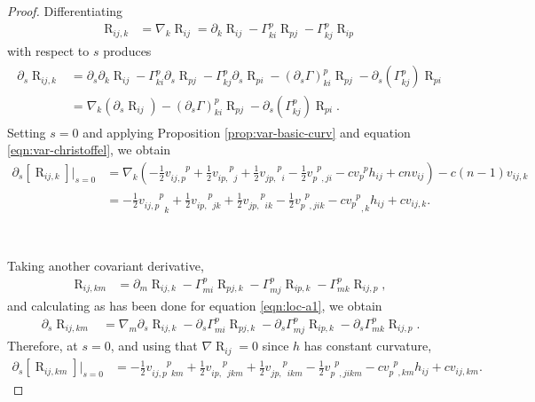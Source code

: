 \documentclass[10pt,reqno]{amsart}
\DeclareMathOperator{\Rc}{R}
\newcommand{\vdu}[2]{v_{#1}^{\phantom{#1} #2}}
\newcommand{\vdddu}[4]{v_{#1 #2, #3}^{\phantom{#1#2,#3} #4}}
\newcommand{\vddud}[4]{v_{#1 #2, \phantom{#3} #4}^{\phantom{#1#2,} #3 \phantom{#4}}}
\newcommand{\vdudd}[4]{v_{#1 \phantom{#2}, #3 #4}^{\phantom{#1} #2 \phantom{, #3 #4}}}
\newcommand{\vdddudd}[6]{v_{#1#2,#3\phantom{#4}#5#6}^{\phantom{#1#2,#3}#4\phantom{#5#6}}}
\newcommand{\vdduddd}[6]{v_{#1#2,\phantom{#3}#4#5#6}^{\phantom{#1#2,}#3\phantom{#4#5#6}}}
\newcommand{\vdudddd}[6]{v_{#1\phantom{#2},#3#4#5#6}^{\phantom{#1}#2\phantom{,#3#4#5#6}}}
\begin{document}
\begin{proof}
Differentiating 
\begin{align*}
\Rc_{ij,k} &= \nabla_k \Rc_{ij} = \partial_k \Rc_{ij} - \Gamma_{ki}^p \Rc_{pj} - \Gamma_{kj}^p \Rc_{ip}
\end{align*}
with respect to $s$ produces
\begin{align} \label{eqn:loc-a1}
\begin{aligned}
\partial_s \Rc_{ij,k} 
&= \partial_s \partial_k \Rc_{ij} - \Gamma_{ki}^p \partial_s \Rc_{pj} - \Gamma_{kj}^p \partial_s \Rc_{pi} - (\partial_s\Gamma)_{ki}^p \Rc_{pj} - \partial_s(\Gamma_{kj}^p) \Rc_{pi} \\
	&= \nabla_k (\partial_s \Rc_{ij}) - (\partial_s\Gamma)_{ki}^p \Rc_{pj} - \partial_s(\Gamma_{kj}^p) \Rc_{pi}.
\end{aligned}
\end{align}
Setting $s=0$ and applying Proposition \ref{prop:var-basic-curv} and equation \eqref{eqn:var-christoffel}, we obtain
\begin{align*}
\partial_s [\Rc_{ij,k}] |_{s=0}
&= \nabla_k \left( -\frac{1}{2} \vdddu{i}{j}{p}{p}  + \frac{1}{2} \vddud{i}{p}{p}{j} + \frac{1}{2} \vddud{j}{p}{p}{i} - \frac{1}{2} \vdudd{p}{p}{j}{i} - c \vdu{p}{p} h_{ij} + c n v_{ij} \right) - c(n-1) v_{ij,k} \nonumber \\
&= -\frac{1}{2} {\vdddu{i}{j}{p}{p}}_k  + \frac{1}{2} \vddud{i}{p}{p}{jk} + \frac{1}{2} \vddud{j}{p}{p}{ik} - \frac{1}{2} \vdudd{p}{p}{j}{ik} - c {\vdu{p}{p}}_{,k} h_{ij} + c v_{ij,k}.
\end{align*}

\

Taking another covariant derivative, 
\begin{align*}
\Rc_{ij,km} &= \partial_m \Rc_{ij,k} - \Gamma_{mi}^p \Rc_{pj,k} - \Gamma_{mj}^p \Rc_{ip,k} - \Gamma_{mk}^p \Rc_{ij,p},
\end{align*}
and calculating as has been done for equation \eqref{eqn:loc-a1}, we obtain
\begin{align*}
\partial_s \Rc_{ij,km} &= \nabla_m \partial_s \Rc_{ij,k} - \partial_s \Gamma_{mi}^p \Rc_{pj,k} - \partial_s \Gamma_{mj}^p \Rc_{ip,k} - \partial_s \Gamma_{mk}^p \Rc_{ij,p}.
\end{align*}
Therefore, at $s=0$, and using that $\nabla \Rc_{ij} = 0$ since $h$ has constant curvature, 
\begin{align*}
\partial_s [\Rc_{ij,km}] |_{s=0}
&= -\frac{1}{2} \vdddudd{i}{j}{p}{p}{k}{m}  + \frac{1}{2} \vdduddd{i}{p}{p}{j}{k}{m} + \frac{1}{2} \vdduddd{j}{p}{p}{i}{k}{m} - \frac{1}{2} \vdudddd{p}{p}{j}{i}{k}{m} - c \vdudd{p}{p}{k}{m} h_{ij} + c v_{ij,km}.
\end{align*}


\end{proof}
\end{document}
